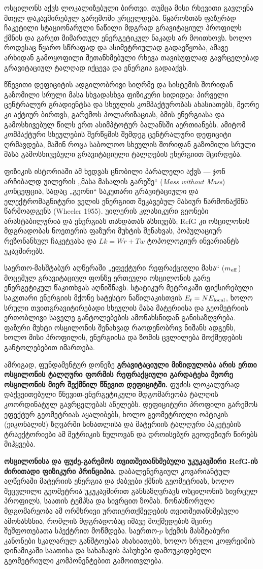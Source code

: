 \documentclass[11pt,a4paper]{article}
\begin{document}
ოსცილონს აქვს ლოკალიზებული ბირთვი, თუმცა მისი რხევითი გავლენა მთელ დაკავშირებულ გარემოში ვრცელდება. წყაროსთან ფაზურად ჩაკეტილი სტაციონარული ნაწილი მდგრად გრავიტაციულ პროფილს ქმნის და გარეთ მიმართულ ენერგეტიკულ ნაკადს არ მოითხოვს. ხოლო როდესაც წყარო სწრაფად და ასიმეტრიულად გადაეწყობა, ამავე არხიდან გამოყოფილი შეთანხმებული რხევა თავისუფლად გავრცელებად გრავიტაციულ ტალღად იქცევა და ენერგია გადააქვს.

წნევითი დეფიციტის ადგილობრივი სიღრმე და სისტემის შორიდან გაზომილი სრული მასა სხვადასხვა ფიზიკური სიდიდეა: პირველი ცენტრალურ გრადიენტსა და სხეულის კომპაქტურობას ახასიათებს, მეორე კი აქტიურ ბირთვს, გარემოს პოლარიზაციას, ბმის ენერგიასა და გამოსხივებულ წილს ერთ ასიმპტოტურ ბალანსში აერთიანებს. ამიტომ კომპაქტური სხეულების შერწყმის შემდეგ ცენტრალური დეფიციტი ღრმავდება, მაშინ როცა საბოლოო სხეულის შორიდან გაზომილი სრული მასა გამოსხივებული გრავიტაციული ტალღების ენერგიით მცირდება.

ფიზიკის ისტორიაში ამ ხედვას ცნობილი პარალელი აქვს — ჯონ არჩიბალდ უილერის „მასა მასალის გარეშე“ (\emph{Mass without Mass}) კონცეფცია, სადაც „გეონი“ საკუთარი გრავიტაციული და ელექტრომაგნიტური ველის ენერგიით შეკავებულ მასიურ წარმონაქმნს წარმოადგენს (Wheeler 1955). უილერის კლასიკური გეონები არასტაბილურია და ენერგიას თანდათან ასხივებს; RefG კი ოსცილონის მდგრადობას ნოეთერის ფაზური მუხტის შენახვას, პოპულაციურ რეზონანსულ ჩაკეტვასა და $Lk = Wr + Tw$ ტოპოლოგიურ ინვარიანტს უკავშირებს.

საერთო-მასშტაბურ აღწერაში „ეფექტური რეფრაქციული მასა“ ($m_{\rm eff}$) მოცემულ გრავიტაციულ ფონზე ერთეული ოსცილონის გარე ენერგეტიკულ წაკითხვას აღნიშნავს. სტატიკურ მეტრიკაში ფიქსირებული საკუთარი ენერგიის მქონე სატესტო ნაწილაკისთვის $E_t=N E_{\rm local}$, ხოლო სრული თვითგრავიტირებადი სხეულის მასა მატერიისა და გეომეტრიის ერთობლივი საველე განტოლებების ამონახსნიდან განისაზღვრება. ფაზური მუხტი ოსცილონის შენახვად რაოდენობრივ ნიშანს ადგენს, ხოლო მისი პროფილის, ენერგიისა და ზომის ცვლილება მოქმედების განტოლებებით იმართება.

ამრიგად, ფუნდამენტურ დონეზე \textbf{გრავიტაციული მიზიდულობა არის ერთი ოსცილონის ტალღური ფორმის რეფრაქციული გარდატეხა მეორე ოსცილონის მიერ შექმნილ წნევით დეფიციტში.} ფუძის ლოკალურად დაქვეითებული წნევით-ენერგეტიკული მდგომარეობა ტალღის კოორდინატულ გავრცელებას ანელებს. დეფიციტური პროფილი გარემოს ეფექტურ გეომეტრიას აყალიბებს, ხოლო გეომეტრიული ოპტიკის (ეიკონალის) ზღვარში სინათლისა და მატერიის ტალღური პაკეტების ტრაექტორიები ამ მეტრიკის ნულოვან და დროისებურ გეოდეზიურ წირებს მიჰყვება.

\textbf{ოსცილონისა და ფუძე-გარემოს თვითშეთანხმებული უკუკავშირი RefG-ის ძირითადი ფიზიკური პრინციპია.} დაბალენერგიულ კოვარიანტულ აღწერაში მატერიის ენერგია და ძაბვები ქმნის გეომეტრიას, ხოლო შეცვლილი გეომეტრია უკუკავშირით განსაზღვრავს ოსცილონის სივრცულ პროფილს, საათის ტემპსა და სივრცით ზომას. წონასწორული მდგომარეობა ამ ორმხრივი ურთიერთქმედების თვითშეთანხმებული ამონახსნია, რომლის მდგრადობაც იმავე მოქმედების მცირე შეშფოთებათა სპექტრით მოწმდება. საერთო-$p$ სქემის მასშტაბური კანონები სკალარულ განშტოებას ახასიათებს, ხოლო სრული კოფრეიმის დინამიკაში საათისა და სახაზავის პასუხები დამოუკიდებელი გეომეტრიული კომპონენტებით გამოითვლება.
\end{document}
